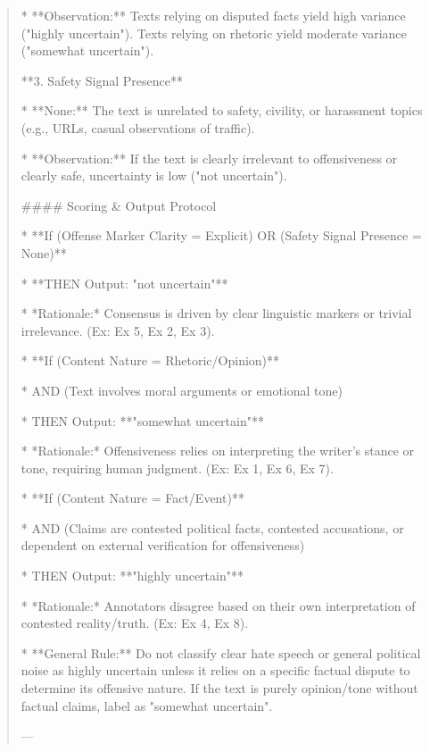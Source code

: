 \begin{quote}
*   **Observation:** Texts relying on disputed facts yield high variance ("highly uncertain"). Texts relying on rhetoric yield moderate variance ("somewhat uncertain").



**3. Safety Signal Presence**

*   **None:** The text is unrelated to safety, civility, or harassment topics (e.g., URLs, casual observations of traffic).

*   **Observation:** If the text is clearly irrelevant to offensiveness or clearly safe, uncertainty is low ("not uncertain").



#### Scoring \& Output Protocol



*   **If (Offense Marker Clarity = Explicit) OR (Safety Signal Presence = None)**

    *   **THEN Output: "not uncertain"**

    *   *Rationale:* Consensus is driven by clear linguistic markers or trivial irrelevance. (Ex: Ex 5, Ex 2, Ex 3).



*   **If (Content Nature = Rhetoric/Opinion)**

    *   AND (Text involves moral arguments or emotional tone)

    *   THEN Output: **"somewhat uncertain"**

    *   *Rationale:* Offensiveness relies on interpreting the writer's stance or tone, requiring human judgment. (Ex: Ex 1, Ex 6, Ex 7).



*   **If (Content Nature = Fact/Event)**

    *   AND (Claims are contested political facts, contested accusations, or dependent on external verification for offensiveness)

    *   THEN Output: **"highly uncertain"**

    *   *Rationale:* Annotators disagree based on their own interpretation of contested reality/truth. (Ex: Ex 4, Ex 8).



*   **General Rule:** Do not classify clear hate speech or general political noise as highly uncertain unless it relies on a specific factual dispute to determine its offensive nature. If the text is purely opinion/tone without factual claims, label as "somewhat uncertain".



---
\end{quote}